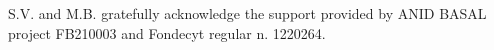 \documentclass[baaa]{baaa}
\begin{document}
\begin{acknowledgement}
S.V. and M.B. gratefully acknowledge the support provided by ANID BASAL project FB210003 and Fondecyt regular n. 1220264.
\end{acknowledgement}



\small

 
\end{document}
